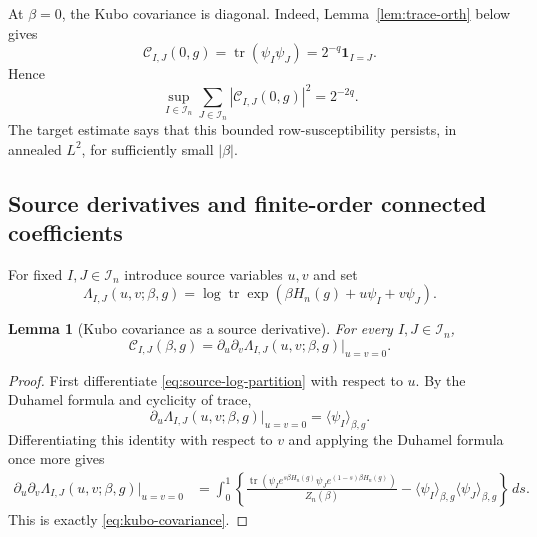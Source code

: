 \documentclass[11pt]{article}
\newtheorem{lemma}[theorem]{Lemma}
\newcommand{\tr}{\operatorname{tr}}
\newcommand{\calI}{\mathcal{I}}
\newcommand{\dd}{\,d}
\newcommand{\ind}{\mathbf{1}}
\begin{document}
At $\beta=0$, the Kubo covariance is diagonal.  Indeed,
Lemma~\ref{lem:trace-orth} below gives
\begin{equation}\label{eq:kubo-beta-zero}
  \mathcal C_{I,J}(0,g)
  =
  \tr(\psi_I\psi_J)
  =
  2^{-q}\ind_{I=J}.
\end{equation}
Hence
\begin{equation}\label{eq:kubo-beta-zero-sum}
  \sup_{I\in\calI_n}
  \sum_{J\in\calI_n}
  \left|\mathcal C_{I,J}(0,g)\right|^2
  =
  2^{-2q}.
\end{equation}
The target estimate says that this bounded row-susceptibility persists, in
annealed $L^2$, for sufficiently small $|\beta|$.

\subsection{Source derivatives and finite-order connected coefficients}

For fixed $I,J\in\calI_n$ introduce source variables $u,v$ and set
\begin{equation}\label{eq:source-log-partition}
  \Lambda_{I,J}(u,v;\beta,g)
  =
  \log\tr\exp\left(\beta H_n(g)+u\psi_I+v\psi_J\right).
\end{equation}

\begin{lemma}[Kubo covariance as a source derivative]
  \label{lem:kubo-source-derivative}
  For every $I,J\in\calI_n$,
  \begin{equation}\label{eq:kubo-source-derivative}
    \mathcal C_{I,J}(\beta,g)
    =
    \partial_u\partial_v\Lambda_{I,J}(u,v;\beta,g)\big|_{u=v=0}.
  \end{equation}
\end{lemma}

\begin{proof}
  First differentiate \eqref{eq:source-log-partition} with respect to $u$.
  By the Duhamel formula and cyclicity of trace,
  \begin{equation}\label{eq:first-source-derivative}
    \partial_u\Lambda_{I,J}(u,v;\beta,g)\big|_{u=v=0}
    =
    \langle\psi_I\rangle_{\beta,g}.
  \end{equation}
  Differentiating this identity with respect to $v$ and applying the Duhamel
  formula once more gives
  \begin{align}\label{eq:second-source-derivative-proof}
    \partial_u\partial_v\Lambda_{I,J}(u,v;\beta,g)\big|_{u=v=0}
    &=
    \int_0^1
    \left\{
      \frac{
        \tr\left(\psi_I e^{s\beta H_n(g)}
        \psi_J e^{(1-s)\beta H_n(g)}\right)
      }{Z_n(\beta)}
      -
      \langle\psi_I\rangle_{\beta,g}
      \langle\psi_J\rangle_{\beta,g}
    \right\}
    \dd s.
  \end{align}
  This is exactly \eqref{eq:kubo-covariance}.
\end{proof}
\end{document}
